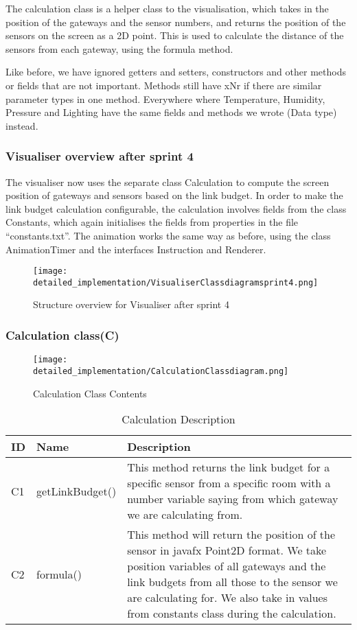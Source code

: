 \documentclass[../document]{subfiles}
\begin{document}
The calculation class is a helper class to the visualisation, which takes in the position of the gateways and the sensor numbers, and returns the position of the sensors on the screen as a 2D point. This is used to calculate the distance of the sensors from each gateway, using the formula method.

Like before, we have ignored getters and setters, constructors and other methods or fields that are not important. Methods still have xNr if there are similar parameter types in one method. Everywhere where Temperature, Humidity, Pressure and Lighting have the same fields and methods we wrote (Data type) instead.

\subsubsection{Visualiser overview after sprint 4}

The visualiser now uses the separate class Calculation to compute the screen position of gateways and sensors based on the link budget. In order to make the link budget calculation configurable, the calculation involves fields from the class Constants, which again initialises the fields from properties in the file “constants.txt”. The animation works the same way as before, using the class AnimationTimer and the interfaces Instruction and Renderer.

\begin{figure}[H]
\centering
\texttt{[image: detailed\_implementation/VisualiserClassdiagramsprint4.png]}
\caption{Structure overview for Visualiser after sprint 4}
\end{figure}

\subsubsection{Calculation class(C)}

\begin{figure}[H]
\centering
\texttt{[image: detailed\_implementation/CalculationClassdiagram.png]}
\caption{Calculation Class Contents}
\end{figure}

\begin{table}[H]
\caption{Calculation Description}
\centering
\begin{tabularx}{\textwidth}{|L{1.2cm}|L{3.5cm}|X|}
\hline ID
&Name
&Description
\\ \hline C1
&getLinkBudget()
&This method returns the link budget for a specific sensor from a specific room with a number variable saying from which gateway we are calculating from.
\\ \hline C2
&formula()
&This method will return the position of the sensor in javafx Point2D format. We take position variables of all gateways and the link budgets from all those to the sensor we are calculating for. We also take in values from constants class during the calculation.
\\ \hline 
\end{tabularx}
\end{table}
\end{document}
